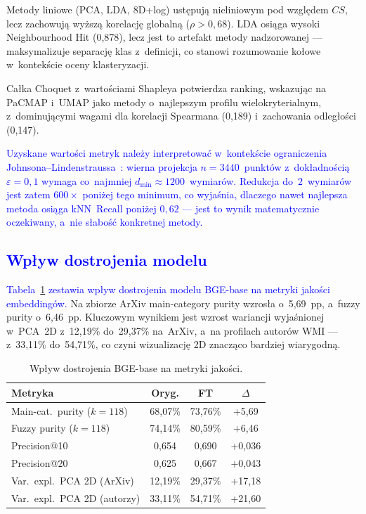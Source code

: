 \documentclass[a4paper,11pt,twocolumn]{article}
\newcommand{\hl}[1]{\textcolor{blue}{#1}}
\begin{document}
Metody liniowe (PCA, LDA, 8D+log) ustępują nieliniowym pod względem
$CS$, lecz zachowują wyższą korelację globalną ($\rho > 0{,}68$).
LDA osiąga wysoki Neighbourhood Hit (0,878), lecz jest to artefakt
metody nadzorowanej --- maksymalizuje separację klas z~definicji,
co stanowi rozumowanie kołowe w~kontekście oceny klasteryzacji.

Całka Choquet z~wartościami Shapleya potwierdza ranking, wskazując
na PaCMAP i~UMAP jako metody o~najlepszym profilu wielokryterialnym,
z~dominującymi wagami dla korelacji Spearmana (0,189) i~zachowania
odległości (0,147).

\hl{Uzyskane wartości metryk należy interpretować w~kontekście
ograniczenia Johnsona--Lindenstraussa~\cite{johnson1984}: wierna projekcja
$n=3440$~punktów z~dokładnością $\varepsilon=0{,}1$ wymaga co~najmniej
$d_{\min} \approx 1200$~wymiarów. Redukcja do~$2$~wymiarów jest zatem
$600\times$ poniżej tego minimum, co wyjaśnia, dlaczego nawet najlepsza
metoda osiąga kNN~Recall poniżej $0{,}62$ --- jest to wynik
matematycznie oczekiwany, a~nie słabość konkretnej metody.}


\subsection{\hl{Wpływ dostrojenia modelu}}

\hl{Tabela~\ref{tab:finetune} zestawia wpływ dostrojenia modelu
BGE-base na metryki jakości embeddingów.} Na zbiorze
ArXiv main-category purity wzrosła o~5,69~pp, a~fuzzy purity
o~6,46~pp. Kluczowym wynikiem jest wzrost wariancji wyjaśnionej
w~PCA~2D z~12,19\% do~29,37\% na~ArXiv, a~na profilach autorów
WMI --- z~33,11\% do~54,71\%, co czyni wizualizację 2D znacząco
bardziej wiarygodną.

\begin{table}[t]
\centering
\caption{Wpływ dostrojenia BGE-base na metryki jakości.}
\label{tab:finetune}
\small
\begin{tabular}{@{}lccc@{}}
\toprule
Metryka & Oryg. & FT & $\Delta$ \\
\midrule
Main-cat.\ purity ($k\!=\!118$) & 68,07\% & 73,76\% & +5,69 \\
Fuzzy purity ($k\!=\!118$) & 74,14\% & 80,59\% & +6,46 \\
Precision@10 & 0,654 & 0,690 & +0,036 \\
Precision@20 & 0,625 & 0,667 & +0,043 \\
Var.\ expl.\ PCA 2D (ArXiv) & 12,19\% & 29,37\% & +17,18 \\
Var.\ expl.\ PCA 2D (autorzy) & 33,11\% & 54,71\% & +21,60 \\
\bottomrule
\end{tabular}
\end{table}
\end{document}
